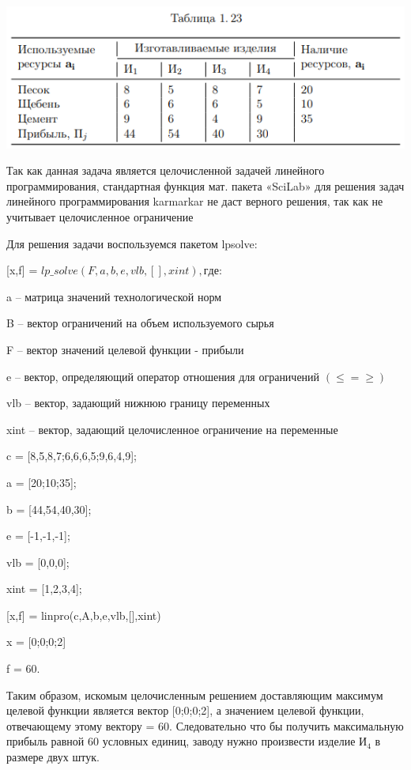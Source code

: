 \documentclass[russian,utf8,nocolumnxxxi,nocolumnxxxii]{eskdtext}
\begin{document}
{\begin{center}
\includegraphics[scale=0.7]{2019-01-09_01-47-19}
\end{center}
Так как данная задача является целочисленной задачей линейного программирования, стандартная функция мат. пакета «SciLab» для решения задач линейного программирования karmarkar не даст верного решения, так как не учитывает целочисленное ограничение
\newpage
\par
\normalsize
Для решения задачи воспользуемся пакетом lpsolve:

[x,f] =  $lp\_solve(F,a,b,e,vlb,[],xint), где:$

a – матрица значений технологической норм

B – вектор ограничений на объем используемого сырья

F – вектор значений целевой функции - прибыли

e – вектор, определяющий оператор отношения для ограничений $(\leq  =  \geq)$

vlb – вектор, задающий нижнюю границу переменных

xint – вектор, задающий целочисленное ограничение на переменные


c = [8,5,8,7;6,6,6,5;9,6,4,9];

a = [20;10;35];

b = [44,54,40,30];

e = [-1,-1,-1];

vlb = [0,0,0];

xint = [1,2,3,4];

[x,f] =  linpro(c,A,b,e,vlb,[],xint)

x = [0;0;0;2]

f = 60.

Таким образом, искомым целочисленным решением доставляющим максимум целевой функции является вектор [0;0;0;2], а значением целевой функции, отвечающему этому вектору = 60. Следовательно что бы получить максимальную прибыль равной 60 условных единиц, заводу нужно произвести изделие И$_4$ в размере двух штук.

}
\end{document}
